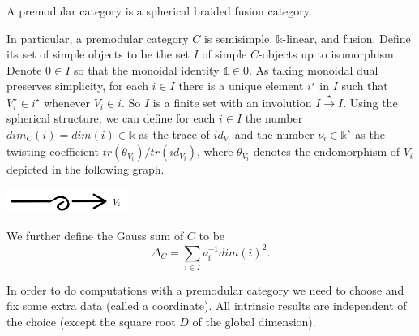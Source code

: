 \begin{definition}\label{def/premodular-category}
  A premodular category is a spherical braided fusion category.
\end{definition}

\noindent In particular, a premodular category $C$ is semisimple,
$\mathbb{k}$-linear, and fusion. Define its set of simple objects to be
the set $I$ of simple $C$-objects up to isomorphism. Denote
$0 \in I$ so that the monoidal identity $\mathbb{1} \in 0$. As
taking monoidal dual preserves simplicity, for each $i \in I$
there is a unique element $i^{\star}$ in $I$ such that
$V_{i}^{\star} \in i^{\star}$ whenever $V_{i} \in i$. So $I$ is a
finite set with an involution $I \xrightarrow{\star} I$. Using
the spherical structure, we can define for each $i \in I$ the
number $dim_{C}(i) = dim(i) \in \mathbb{k}$ as the trace of
$id_{V_{i}}$ and the number $\nu_{i} \in \mathbb{k}^{\star}$ as
the twisting coefficient $tr(\theta_{V_{i}})/tr(id_{V_{i}})$,
where $\theta_{V_{i}}$ denotes the endomorphism of $V_{i}$
depicted in the following graph.
\begin{center}
  \includegraphics[height=0.8cm]{twist}
\end{center}
We further define the Gauss sum of $C$ to be
$$\Delta_{C} = \sum_{i \in I} \nu_{i}^{-1}dim(i)^{2}.$$

\noindent In order to do computations with a premodular category
we need to choose and fix some extra data (called a coordinate).
All intrinsic results are independent of the choice (except the
square root $D$ of the global dimension).

